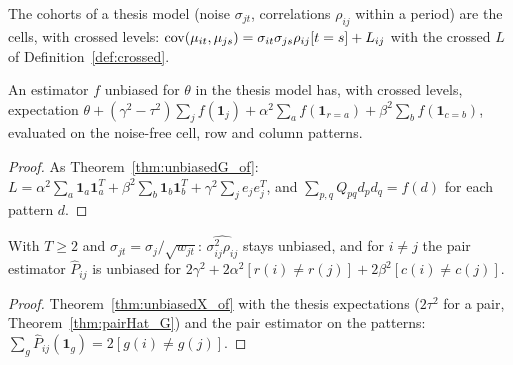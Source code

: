 The cohorts of a thesis model (noise $\sigma_{jt}$, correlations $\rho_{ij}$ within a period)
are the cells, with crossed levels: $\operatorname{cov}(\mu_{it}, \mu_{js}) = \sigma_{it}\sigma_{js}\rho_{ij}
[t = s] + L_{ij}$ with the crossed $L$ of Definition~\ref{def:crossed}.

\begin{theorem}\label{thm:unbiasedX_of}
  \leanok
  An estimator $f$ unbiased for $\theta$ in the thesis model has, with crossed levels,
  expectation $\theta + (\gamma^2 - \tau^2)\sum_j f(\mathbf 1_j) + \alpha^2\sum_a f(\mathbf 1_{r = a})
  + \beta^2\sum_b f(\mathbf 1_{c = b})$, evaluated on the noise-free cell, row and column patterns.
\end{theorem}
\begin{proof}
  \leanok
  As Theorem~\ref{thm:unbiasedG_of}: $L = \alpha^2\sum_a \mathbf 1_a\mathbf 1_a^T
  + \beta^2\sum_b \mathbf 1_b\mathbf 1_b^T + \gamma^2\sum_j e_je_j^T$, and $\sum_{p,q} Q_{pq}
  d_pd_q = f(d)$ for each pattern $d$.
\end{proof}

\begin{theorem}\label{thm:pairHat_X}
  \leanok
  With $T \ge 2$ and $\sigma_{jt} = \sigma_j/\sqrt{w_{jt}}$: $\widehat{\sigma^2_{ij}\rho_{ij}}$
  stays unbiased, and for $i \ne j$ the pair estimator $\widehat P_{ij}$ is unbiased for
  $2\gamma^2 + 2\alpha^2[r(i) \ne r(j)] + 2\beta^2[c(i) \ne c(j)]$.
\end{theorem}
\begin{proof}
  \leanok
  Theorem~\ref{thm:unbiasedX_of} with the thesis expectations ($2\tau^2$ for a pair,
  Theorem~\ref{thm:pairHat_G}) and the pair estimator on the patterns:
  $\sum_g \widehat P_{ij}(\mathbf 1_g) = 2[g(i) \ne g(j)]$.
\end{proof}

